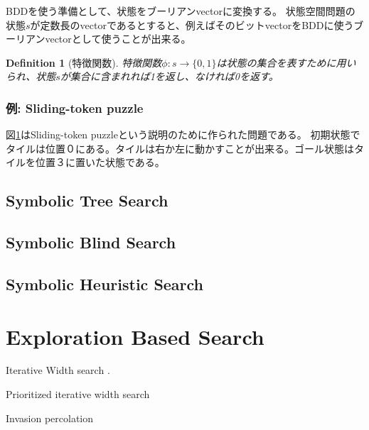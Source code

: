 \documentclass{report}
\newtheorem{definition}{Definition}
\begin{document}
BDDを使う準備として、状態をブーリアンvectorに変換する。
状態空間問題の状態$s$が定数長のvectorであるとすると、例えばそのビットvectorをBDDに使うブーリアンvectorとして使うことが出来る。

\begin{definition}[特徴関数]
特徴関数$\phi: s \rightarrow \{0, 1\}$は状態の集合を表すために用いられ、状態$s$が集合に含まれれば1を返し、なければ0を返す。
\end{definition}


\subsubsection{例: Sliding-token puzzle}

図\ref{fig:sliding-token}はSliding-token puzzleという説明のために作られた問題である。
初期状態でタイルは位置０にある。タイルは右か左に動かすことが出来る。ゴール状態はタイルを位置３に置いた状態である。

\begin{figure}
\label{fig:sliding-token}
\end{figure}

\subsection{Symbolic Tree Search}


\subsection{Symbolic Blind Search}


\subsection{Symbolic Heuristic Search}


\section{Exploration Based Search}

Iterative Width search \cite{lipovetzkyg12}.

Prioritized iterative width search \cite{shleyfmantd16}

Invasion percolation \cite{asai2016tiebreaking}
\end{document}
